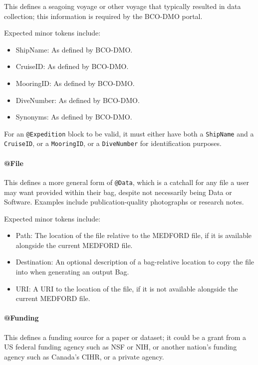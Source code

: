 \documentclass[10pt]{article}
\begin{document}
    This defines a seagoing voyage or other voyage that typically resulted in data collection; this information is required by the BCO-DMO portal.
    
    Expected minor tokens include:
    \begin{itemize}
        \item ShipName: As defined by BCO-DMO.
        \item CruiseID: As defined by BCO-DMO.
        \item MooringID: As defined by BCO-DMO.
        \item DiveNumber: As defined by BCO-DMO.
        \item Synonyms: As defined by BCO-DMO.
    \end{itemize}
    
    For an \texttt{@Expedition} block to be valid, it must either have both a \texttt{ShipName} and a \texttt{CruiseID}, or a \texttt{MooringID}, or a \texttt{DiveNumber} for identification purposes.
    
    \paragraph{@File}
    
    This defines a more general form of \texttt{@Data}, which is a catchall for any file a user may want provided within their bag, despite not necessarily being Data or Software. Examples include publication-quality photographs or research notes. 
    
    Expected minor tokens include:
    \begin{itemize}
        \item Path: The location of the file relative to the MEDFORD file, if it is available alongside the current MEDFORD file.
        \item Destination: An optional description of a bag-relative location to copy the file into when generating an output Bag.
        \item URI: A URI to the location of the file, if it is not available alongside the current MEDFORD file.
    \end{itemize}
    
    \paragraph{@Funding}
    
    This defines a funding source for a paper or dataset; it could be a grant from a US federal funding agency such as NSF or NIH, or another nation's funding agency such as Canada's CIHR, or a private agency.
    
\end{document}
